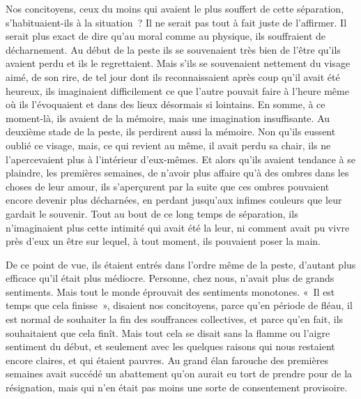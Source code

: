 \documentclass[french,twoside]{book} %
\begin{document}
Nos concitoyens, ceux du moins qui avaient le plus souffert de cette séparation, s’habituaient-ils à la situation ? Il ne serait pas tout à fait juste de l’affirmer. Il serait plus exact de dire qu’au moral comme au physique, ils souffraient de décharnement. Au début de la peste ils se souvenaient très bien de l’être qu’ils avaient perdu et ils le regrettaient. Mais s’ils se souvenaient nettement du visage aimé, de son rire, de tel jour dont ils reconnaissaient après coup qu’il avait été heureux, ils imaginaient difficilement ce que l’autre pouvait faire à l’heure même où ils l’évoquaient et dans des lieux désormais si lointains. En somme, à ce moment-là, ils avaient de la mémoire, mais une imagination insuffisante. Au deuxième stade de la peste, ils perdirent aussi la mémoire. Non qu’ils eussent oublié ce visage, mais, ce qui revient au même, il avait perdu sa chair, ils ne l’apercevaient plus à l’intérieur d’eux-mêmes. Et alors qu’ils avaient tendance à se plaindre, les premières semaines, de n’avoir plus affaire qu’à des ombres dans les choses de leur amour, ils s’aperçurent par la suite que ces ombres pouvaient encore devenir plus décharnées, en perdant jusqu’aux infimes couleurs que leur gardait le souvenir. Tout au bout de ce long temps de séparation, ils n’imaginaient plus cette intimité qui avait été la leur, ni comment avait pu vivre près d’eux un être sur lequel, à tout moment, ils pouvaient poser la main.\par
De ce point de vue, ils étaient entrés dans l’ordre même de la peste, d’autant plus efficace qu’il était plus médiocre. Personne, chez nous, n’avait plus de grands sentiments. Mais tout le monde éprouvait des sentiments monotones. « Il est temps que cela finisse », disaient nos concitoyens, parce qu’en période de fléau, il est normal de souhaiter la fin des souffrances collectives, et parce qu’en fait, ils souhaitaient que cela finît. Mais tout cela se disait sans la flamme ou l’aigre sentiment du début, et seulement avec les quelques raisons qui nous restaient encore claires, et qui étaient pauvres. Au grand élan farouche des premières semaines avait succédé un abattement qu’on aurait eu tort de prendre pour de la résignation, mais qui n’en était pas moins une sorte de consentement provisoire.\par
\end{document}
